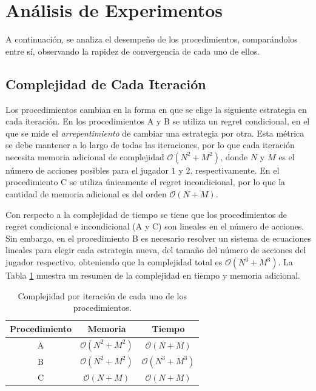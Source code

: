  
\section{Análisis de Experimentos}
A continuación, se analiza el desempeño de los procedimientos, comparándolos entre sí, observando la rapidez de convergencia de cada uno de ellos.

\subsection{Complejidad de Cada Iteración}

Los procedimientos cambian en la forma en que se elige la siguiente estrategia en cada iteración. En los procedimientos A y B se utiliza un regret condicional, en el que se mide el \textit{arrepentimiento} de cambiar una estrategia por otra. Esta métrica se debe mantener a lo largo de todas las iteraciones, por lo que cada iteración necesita memoria adicional de complejidad $\mathcal{O}(N^2 + M^2)$, donde $N$ y $M$ es el número de acciones posibles para el jugador $1$ y $2$, respectivamente. En el procedimiento C se utiliza únicamente el regret incondicional, por lo que la cantidad de memoria adicional es del orden $\mathcal{O}(N + M)$.

Con respecto a la complejidad de tiempo se tiene que los procedimientos de regret condicional e incondicional (A y C) son lineales en el número de acciones. Sin embargo, en el procedimiento B es necesario resolver un sistema de ecuaciones lineales para elegir cada estrategia nueva, del tamaño del número de acciones del jugador respectivo, obteniendo que la complejidad total es $\mathcal{O}(N^3 + M^3)$. La Tabla \ref{tab:complejidades-iteraciones} muestra un resumen de la complejidad en tiempo y memoria adicional.

\begin{table}[h]
    \caption{Complejidad por iteración de cada uno de los procedimientos.}
    \label{tab:complejidades-iteraciones}
    \centering
    \begin{tabular}{c c c}
        \toprule
         Procedimiento & Memoria & Tiempo  \\ \midrule
         A & $\mathcal{O}(N^2 + M^2)$ & $\mathcal{O}(N + M)$ \\ 
         B & $\mathcal{O}(N^2 + M^2)$ & $\mathcal{O}(N^3 + M^3)$ \\
         C & $\mathcal{O}(N + M)$     & $\mathcal{O}(N + M)$ \\ \bottomrule
    \end{tabular}
\end{table}

